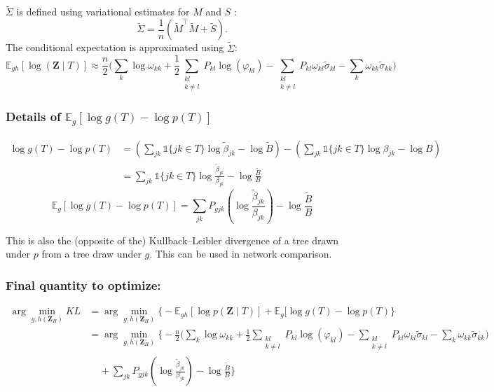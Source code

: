 \documentclass[11pt,a4paper]{article}
\newcommand{\argmin}{\arg\!\min}
\newcommand{\Zbf}{\boldsymbol{Z}}
\newcommand{\Esp}{\mathds{E}}
\begin{document}
$\widetilde{\Sigma}$ is defined using variational estimates for $M$ and $S$ : $$\widetilde{\Sigma} = \frac{1}{n}(\widetilde{M}^\intercal \widetilde{M} + \widetilde{S}). $$
The conditional expectation is approximated using $\widetilde{\Sigma}$:
$$\Esp_{gh} [\log(\Zbf \mid T)] \approx \frac{n}{2} \Big( \sum_{k} \log \omega_{kk}+\frac{1}{2}\sum _{\substack{kl\\ k \neq l}} P_{kl} \log (\varphi_{kl}) - \sum_{\substack{kl\\ k \neq l}} P_{kl} \omega_{kl} \widetilde{\sigma}_{kl} - \sum_{k} \omega_{kk} \widetilde{\sigma}_{kk}\Big)$$
\subsubsection{Details of $\Esp_g[\log g(T) - \log p(T)]$}
\begin{align*}
\log g(T) - \log p(T) &= \left(  \sum_{jk} \mathds{1}\{jk \in T\} \log \widetilde{\beta}_{jk} - \log \widetilde{B}\right) - \left(  \sum_{jk} \mathds{1}\{jk \in T\} \log {\beta}_{jk} - \log {B}\right)\\
&=\sum_{jk} \mathds{1}\{jk \in T\} \log \frac{\widetilde{\beta}_{jk}}{{\beta}_{jk}} - \log \frac{\widetilde{B}}{B}
\end{align*}
$$\boxed{
\Esp_g[\log g(T) - \log p(T)] = \sum_{jk}P_{gjk} \left(\log \frac{\widetilde{\beta}_{jk}}{{\beta}_{jk}}\right) - \log \frac{\widetilde{B}}{B} }$$

 
This is also the (opposite of the) Kullback–Leibler divergence of a tree drawn under $p$ from a tree draw under $g$. This can be used in network comparison.
 
\subsubsection{Final quantity to optimize:}
\begin{align*}
\argmin_{g,h(\Zbf_H)} KL  &=\argmin_{g,h(\Zbf_H)}  \Big\{-\Esp_{gh}[\log p(\Zbf \mid T) ] + \Esp_g[\log g(T) - \log p(T)\Big\}\\
&= \argmin_{g,h(\Zbf_H)}  \bigg\{ -\frac{n}{2} \Big( \sum_{k} \log \omega_{kk}+\frac{1}{2}\sum _{\substack{kl\\ k \neq l}} P_{kl} \log (\varphi_{kl}) - \sum_{\substack{kl\\ k \neq l}} P_{kl} \omega_{kl} \widetilde{\sigma}_{kl} - \sum_{k} \omega_{kk} \widetilde{\sigma}_{kk}\Big) \\
& \;\;\;\; + \sum_{jk}P_{gjk} \left(\log \frac{\widetilde{\beta}_{jk}}{{\beta}_{jk}}\right) - \log \frac{\widetilde{B}}{B} \bigg\}
\end{align*}
 
\end{document}
